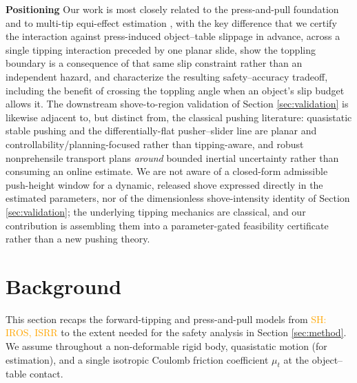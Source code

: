\documentclass[10pt, conference]{IEEEtran}
\newcommand{\sh}[1]{\textcolor{orange}{SH: #1}}
\begin{document}
\noindent \textbf{Positioning} Our work is most closely related to the press-and-pull foundation \cite{hyland_isrr} and to multi-tip equi-effect estimation \cite{yong_yu_estimation_1999, yong_yu_estimation_2001}, with the key difference that we certify the interaction against press-induced object--table slippage in advance, across a single tipping interaction preceded by one planar slide, show the toppling boundary is a consequence of that same slip constraint rather than an independent hazard, and characterize the resulting safety--accuracy tradeoff, including the benefit of crossing the toppling angle when an object's slip budget allows it. The downstream shove-to-region validation of Section \ref{sec:validation} is likewise adjacent to, but distinct from, the classical pushing literature: quasistatic stable pushing \cite{mason_mechanics_1986} and the differentially-flat pusher--slider line \cite{zhou_pushing_nodate} are planar and controllability/planning-focused rather than tipping-aware, and robust nonprehensile transport \cite{heins_robust_2025} plans \emph{around} bounded inertial uncertainty rather than consuming an online estimate. We are not aware of a closed-form admissible push-height window for a dynamic, released shove expressed directly in the estimated parameters, nor of the dimensionless shove-intensity identity of Section \ref{sec:validation}; the underlying tipping mechanics are classical, and our contribution is assembling them into a parameter-gated feasibility certificate rather than a new pushing theory.

\section{Background} \label{sec:background}

This section recaps the forward-tipping and press-and-pull models from \sh{IROS, ISRR} to the extent needed for the safety analysis in Section \ref{sec:method}. We assume throughout a non-deformable rigid body, quasistatic motion (for estimation), and a single isotropic Coulomb friction coefficient $\mu_t$ at the object--table contact.
\end{document}
